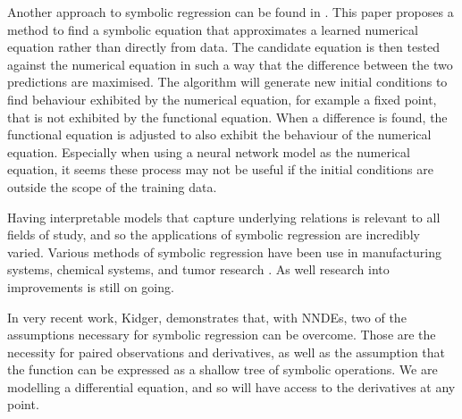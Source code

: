 \documentclass[12pt]{amsart}
\begin{document}
    Another approach to symbolic regression can be found in \cite{bongard2007automated}. This paper proposes a method to find a symbolic equation that approximates a learned numerical equation rather than directly from data. The candidate equation is then tested against the numerical equation in such a way that the difference between the two predictions are maximised. The algorithm will generate new initial conditions to find behaviour exhibited by the numerical equation, for example a fixed point, that is not exhibited by the functional equation. When a difference is found, the functional equation is adjusted to also exhibit the behaviour of the numerical equation. Especially when using a neural network model as the numerical equation, it seems these process may not be useful if the initial conditions are outside the scope of the training data.

    Having interpretable models that capture underlying relations is relevant to all fields of study, and so the applications of symbolic regression are incredibly varied. Various methods of symbolic regression have been use in manufacturing systems, chemical systems, and tumor research \cite{can2011comparison,keith2021combining,yoshihara2013inferring}. As well research into improvements is still on going.

    In very recent work, Kidger\cite{kidger2022neural}, demonstrates that, with NNDEs, two of the assumptions necessary for symbolic regression can be overcome. Those are the necessity for paired observations and derivatives, as well as the assumption that the function can be expressed as a shallow tree of symbolic operations. We are modelling a differential equation, and so will have access to the derivatives at any point. 

    \printbibliography
\end{document}
